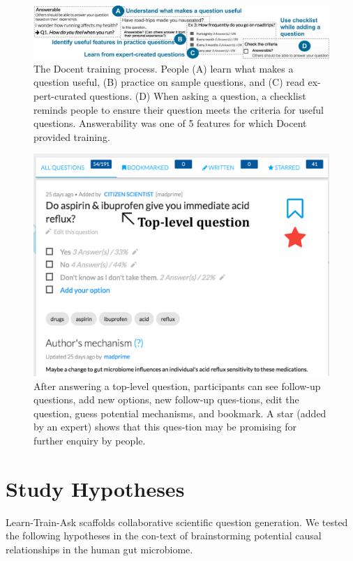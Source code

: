 \begin{figure}[h] 
  \centering
  \includegraphics[width=1.0\textwidth]{figures/docent/fig-3.png}
  \caption[]
{The Docent training process. People (A) learn what makes a question useful, (B) practice on sample questions, and (C) read ex-pert-curated questions. (D) When asking a question, a checklist reminds people to ensure their question meets the criteria for useful questions. Answerability was one of 5 features for which Docent provided training.}
  \label{fig:docent-3}
\end{figure}

\begin{figure}[h] 
  \centering
  \includegraphics[width=1.0\textwidth]{figures/docent/fig-4.png}
  \caption[xxxx]
{After answering a top-level question, participants can see follow-up questions, add new options, new follow-up ques-tions, edit the question, guess potential mechanisms, and bookmark. A star (added by an expert) shows that this ques-tion may be promising for further enquiry by people.}
  \label{fig:docent-4}
\end{figure}

\section{Study Hypotheses}
Learn-Train-Ask scaffolds collaborative scientific question generation. We tested the following hypotheses in the con-text of brainstorming potential causal relationships in the human gut microbiome.

